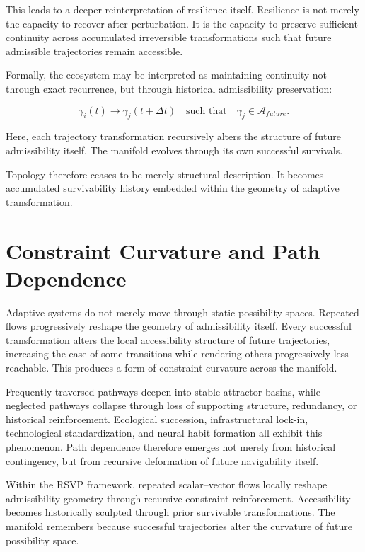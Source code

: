 \documentclass[11pt,a4paper]{article}
\newcommand{\Aspace}{\mathcal{A}}
\begin{document}
This leads to a deeper reinterpretation of resilience itself. Resilience is not merely the capacity to recover after perturbation. It is the capacity to preserve sufficient continuity across accumulated irreversible transformations such that future admissible trajectories remain accessible.

Formally, the ecosystem may be interpreted as maintaining continuity not through exact recurrence, but through historical admissibility preservation:

\[
\gamma_i(t)
\rightarrow
\gamma_j(t+\Delta t)
\quad \text{such that} \quad
\gamma_j \in \Aspace_{future}.
\]

Here, each trajectory transformation recursively alters the structure of future admissibility itself. The manifold evolves through its own successful survivals.

Topology therefore ceases to be merely structural description. It becomes accumulated survivability history embedded within the geometry of adaptive transformation.

\newpage

\section{Constraint Curvature and Path Dependence}

Adaptive systems do not merely move through static possibility spaces. Repeated flows progressively reshape the geometry of admissibility itself. Every successful transformation alters the local accessibility structure of future trajectories, increasing the ease of some transitions while rendering others progressively less reachable. This produces a form of constraint curvature across the manifold.

Frequently traversed pathways deepen into stable attractor basins, while neglected pathways collapse through loss of supporting structure, redundancy, or historical reinforcement. Ecological succession, infrastructural lock-in, technological standardization, and neural habit formation all exhibit this phenomenon. Path dependence therefore emerges not merely from historical contingency, but from recursive deformation of future navigability itself.

Within the RSVP framework, repeated scalar--vector flows locally reshape admissibility geometry through recursive constraint reinforcement. Accessibility becomes historically sculpted through prior survivable transformations. The manifold remembers because successful trajectories alter the curvature of future possibility space.
\end{document}
